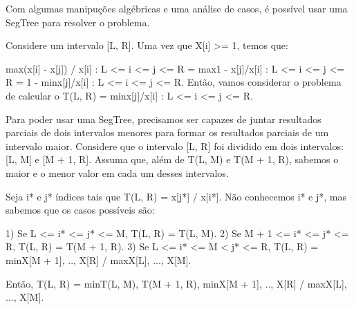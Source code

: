 Com algumas manipuções algébricas e uma análise de casos, é possível usar uma SegTree para resolver o problema. 

Considere um intervalo [L, R]. Uma vez que X[i] >= 1, temos que:

max{(x[i] - x[j]) / x[i] : L <= i <= j <= R} =  max{1 - x[j]/x[i] : L <= i <= j <= R} = 1 - min{x[j]/x[i] : L <= i <= j <= R}.  Então, vamos considerar o problema de calcular o T(L, R) = min{x[j]/x[i] : L <= i <= j <= R}.

Para poder usar uma SegTree, precisamos ser capazes de juntar resultados parciais de dois intervalos menores para formar os resultados parciais de um intervalo maior. Considere que o intervalo [L, R] foi dividido em dois intervalos: [L, M] e [M + 1, R]. Assuma que, além de T(L, M) e T(M + 1, R), sabemos o maior e o menor valor em cada um desses intervalos.

Seja i* e j* índices tais que T(L, R) = x[j*] / x[i*]. Não conhecemos i* e j*, mas sabemos que os casos possíveis são:

1) Se L <= i* <= j* <= M, T(L, R) = T(L, M).
2) Se M + 1 <= i* <= j* <= R, T(L, R) = T(M + 1, R).
3) Se L <= i* <= M < j* <= R, T(L, R) = min{X[M + 1], .., X[R]} / max{X[L], ..., X[M]}.

Então, T(L, R) = min{T(L, M), T(M + 1, R), min{X[M + 1], .., X[R]} / max{X[L], ..., X[M]}}.
